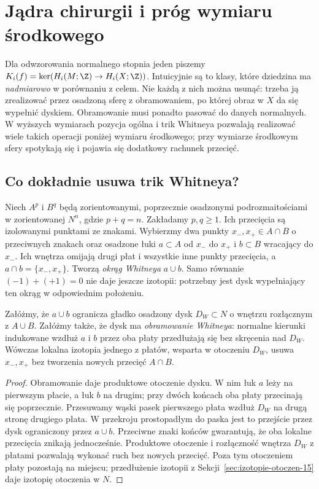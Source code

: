\section{Jądra chirurgii i próg wymiaru środkowego}
\label{sec:jadra-chirurgii-21}

Dla odwzorowania normalnego stopnia jeden
piszemy $K_i(f)=\ker(H_i(M;\Z)\to H_i(X;\Z))$.
Intuicyjnie są to klasy, które dziedzina ma
\emph{nadmiarowo} w porównaniu z celem.
Nie każdą z nich można usunąć: trzeba ją
zrealizować przez osadzoną sferę z obramowaniem,
po której obraz w $X$ da się wypełnić dyskiem.
Obramowanie musi ponadto pasować do danych
normalnych. W wyższych wymiarach pozycja ogólna
i trik Whitneya pozwalają realizować wiele
takich operacji poniżej wymiaru środkowego;
przy wymiarze środkowym sfery spotykają się
i pojawia się dodatkowy rachunek przecięć.

\subsection*{Co dokładnie usuwa trik Whitneya?}
Niech $A^p$ i $B^q$ będą zorientowanymi,
poprzecznie osadzonymi podrozmaitościami
w zorientowanej $N^n$, gdzie $p+q=n$.
Zakładamy $p,q\geq1$.
Ich przecięcia są izolowanymi punktami ze znakami.
Wybierzmy dwa punkty $x_-,x_+\in A\cap B$
o przeciwnych znakach oraz osadzone łuki
$a\subset A$ od $x_-$ do $x_+$
i $b\subset B$ wracający do $x_-$.
Ich wnętrza omijają drugi płat i wszystkie
inne punkty przecięcia, a $a\cap b=\{x_-,x_+\}$.
Tworzą \emph{okrąg Whitneya} $a\cup b$.
Samo równanie $(-1)+(+1)=0$ nie daje jeszcze
izotopii: potrzebny jest dysk wypełniający ten
okrąg w odpowiednim położeniu.

\begin{stwierdzenie}
\label{prop:lokalny-Whitney-21}
Załóżmy, że $a\cup b$ ogranicza gładko osadzony
dysk $D_W\subset N$ o wnętrzu rozłącznym z
$A\cup B$. Załóżmy także, że dysk ma
\emph{obramowanie Whitneya}: normalne kierunki
indukowane wzdłuż $a$ i $b$ przez oba płaty
przedłużają się bez skręcenia nad $D_W$.
Wówczas lokalna izotopia jednego z płatów,
wsparta w otoczeniu $D_W$, usuwa $x_-,x_+$
bez tworzenia nowych przecięć $A\cap B$.
\end{stwierdzenie}
\begin{proof}
Obramowanie daje produktowe otoczenie dysku.
W nim łuk $a$ leży na pierwszym płacie,
a łuk $b$ na drugim; przy dwóch końcach
oba płaty przecinają się poprzecznie.
Przesuwamy wąski pasek pierwszego płata
wzdłuż $D_W$ na drugą stronę drugiego płata.
W przekroju prostopadłym do paska jest to
przejście przez dysk ograniczony przez $a\cup b$.
Przeciwne znaki końców gwarantują, że oba
lokalne przecięcia znikają jednocześnie.
Produktowe otoczenie i rozłączność wnętrza
$D_W$ z płatami pozwalają wykonać ruch bez
nowych przecięć. Poza tym otoczeniem płaty
pozostają na miejscu; przedłużenie izotopii
z Sekcji~\ref{sec:izotopie-otoczen-15}
daje izotopię otoczenia w $N$.
\end{proof}

